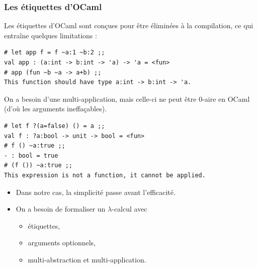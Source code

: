 \documentclass{beamer}
\begin{document}
\begin{frame}[fragile]\frametitle{Les étiquettes d'OCaml}
  Les étiquettes d'OCaml sont conçues pour être éliminées à la compilation, ce
  qui entraîne quelques limitations :
{\color{blue}\begin{verbatim}
# let app f = f ~a:1 ~b:2 ;;
val app : (a:int -> b:int -> 'a) -> 'a = <fun>
# app (fun ~b ~a -> a+b) ;;
This function should have type a:int -> b:int -> 'a.
\end{verbatim}}


On a besoin d'une multi-application, mais celle-ci ne peut être
$0$-aire en OCaml (d'où les arguments ineffaçables).
{\color{blue}\begin{verbatim}
# let f ?(a=false) () = a ;;
val f : ?a:bool -> unit -> bool = <fun>
# f () ~a:true ;;
- : bool = true
# (f ()) ~a:true ;;
This expression is not a function, it cannot be applied.
\end{verbatim}}
\end{frame}

\begin{frame}
  \begin{itemize}
  \item Dans notre cas, la simplicité passe avant l'efficacité.
  \item On a besoin de formaliser un $\lambda$-calcul avec
    \begin{itemize}
    \item étiquettes,
    \item arguments optionnels,
    \item multi-abstraction et multi-application.
    \end{itemize}
  \end{itemize}
\end{frame}
\end{document}
